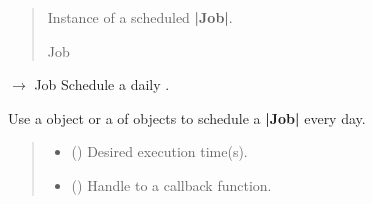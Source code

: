 \documentclass[letterpaper,10pt,english]{sphinxmanual}
\begin{document}
\begin{fulllineitems}
\begin{fulllineitems}
\begin{quote}
\begin{description}
\begin{itemize}
\end{itemize}

\sphinxAtStartPar
Instance of a scheduled {\color{red}\bfseries{}|Job|}.

\sphinxAtStartPar
Job

\end{description}\end{quote}

\end{fulllineitems}


\begin{fulllineitems}
\label{\detokenize{index:scheduler.Scheduler.daily}}
\pysigstartsignatures
\pysiglinewithargsret
{}
{\sphinxparamcomma {}\sphinxparamcomma {}}
{{ $\rightarrow$ Job}}
\pysigstopsignatures
\sphinxAtStartPar
Schedule a daily .

\sphinxAtStartPar
Use a  object or a  of  objects
to schedule a {\color{red}\bfseries{}|Job|} every day.
\begin{quote}\begin{description}
\begin{itemize}
\item {} 
\sphinxAtStartPar
{} () \textendash{} Desired execution time(s).

\item {} 
\sphinxAtStartPar
{} (\sphinxstyleliteralemphasis{\sphinxupquote{{[}}}\sphinxstyleliteralemphasis{\sphinxupquote{, }}\sphinxstyleliteralemphasis{\sphinxupquote{{]}}}) \textendash{} Handle to a callback function.


\end{itemize}
\end{description}
\end{quote}
\end{fulllineitems}
\end{fulllineitems}
\end{document}
